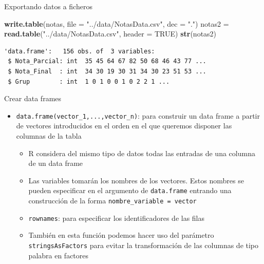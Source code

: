 \documentclass[
  ignorenonframetext,
]{beamer}
\newenvironment{Shaded}{\begin{snugshade}}{\end{snugshade}}
\newcommand{\AttributeTok}[1]{\textcolor[rgb]{0.13,0.29,0.53}{#1}}
\newcommand{\ConstantTok}[1]{\textcolor[rgb]{0.56,0.35,0.01}{#1}}
\newcommand{\FunctionTok}[1]{\textcolor[rgb]{0.13,0.29,0.53}{\textbf{#1}}}
\newcommand{\NormalTok}[1]{#1}
\newcommand{\OtherTok}[1]{\textcolor[rgb]{0.56,0.35,0.01}{#1}}
\newcommand{\StringTok}[1]{\textcolor[rgb]{0.31,0.60,0.02}{#1}}
\providecommand{\tightlist}{%
  \setlength{\itemsep}{0pt}\setlength{\parskip}{0pt}}
\begin{document}
\begin{frame}[fragile]{Exportando datos a ficheros}
\label{exportando-datos-a-ficheros}
\begin{Shaded}
\begin{Highlighting}[]
\FunctionTok{write.table}\NormalTok{(notas, }\AttributeTok{file =} \StringTok{"../data/NotasData.csv"}\NormalTok{,}
            \AttributeTok{dec =} \StringTok{"."}\NormalTok{)}
\NormalTok{notas2 }\OtherTok{=} \FunctionTok{read.table}\NormalTok{(}\StringTok{"../data/NotasData.csv"}\NormalTok{, }\AttributeTok{header =} \ConstantTok{TRUE}\NormalTok{)}
\FunctionTok{str}\NormalTok{(notas2)}
\end{Highlighting}
\end{Shaded}

\begin{verbatim}
'data.frame':   156 obs. of  3 variables:
 $ Nota_Parcial: int  35 45 64 67 82 50 68 46 43 77 ...
 $ Nota_Final  : int  34 30 19 30 31 34 30 23 51 53 ...
 $ Grup        : int  1 0 1 0 0 1 0 2 2 1 ...
\end{verbatim}
\end{frame}

\begin{frame}[fragile]{Crear data frames}
\label{crear-data-frames}
\begin{itemize}
\tightlist
\item
  \texttt{data.frame(vector\_1,...,vector\_n)}: para construir un data
  frame a partir de vectores introducidos en el orden en el que queremos
  disponer las columnas de la tabla

  \begin{itemize}
  \tightlist
  \item
    R considera del mismo tipo de datos todas las entradas de una
    columna de un data frame
  \item
    Las variables tomarán los nombres de los vectores. Estos nombres se
    pueden especificar en el argumento de \texttt{data.frame} entrando
    una construcción de la forma \texttt{nombre\_variable\ =\ vector}
  \item
    \texttt{rownames}: para especificar los identificadores de las filas
  \item
    También en esta función podemos hacer uso del parámetro
    \texttt{stringsAsFactors} para evitar la transformación de las
    columnas de tipo palabra en factores
  \end{itemize}
\end{itemize}
\end{frame}
\end{document}
